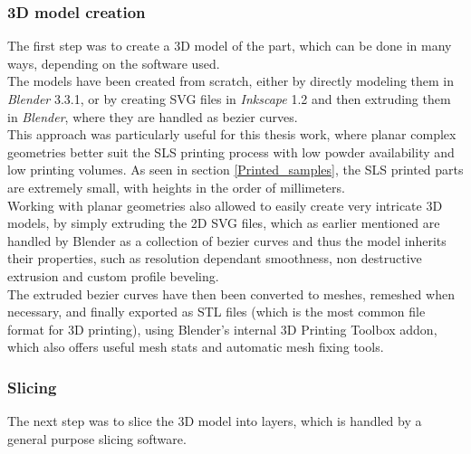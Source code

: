 \documentclass[a4paper]{article}
\begin{document}
          \subsubsection{3D model creation\label{3D_model_creation}}
  
          The first step was to create a 3D model of the part, which can be done in many ways, 
          depending on the software used. \\
  
          The models have been created from scratch, either by directly modeling them in \textit{Blender} 3.3.1,
          or by creating SVG files in \textit{Inkscape} 1.2 and then extruding them in \textit{Blender}, where
          they are handled as bezier curves. \\
  
          This approach was particularly useful for this thesis work, where planar complex geometries better suit the SLS printing process
          with low powder availability and low printing volumes. As seen in section \ref{Printed_samples}, the SLS printed parts 
          are extremely small, with heights in the order of millimeters. \\
          
          Working with planar geometries also allowed to easily create very intricate 3D models, by simply extruding the 2D SVG files, 
          which as earlier mentioned are handled by Blender as a collection of bezier curves and thus the model inherits their properties, such as resolution 
          dependant smoothness, non destructive extrusion and custom profile beveling. \\
  
          The extruded bezier curves have then been converted to meshes, remeshed when necessary, and finally 
          exported as STL files (which is the most common file format for 3D printing), using 
          Blender's internal 3D Printing Toolbox addon, which also offers useful mesh stats and 
          automatic mesh fixing tools. \\
          
          \subsubsection{Slicing\label{Slicing}}
          
          The next step was to slice the 3D model into layers, which is handled by a general purpose slicing software. \\
  
\end{document}
